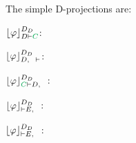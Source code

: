 \begin{example}
\label{example:DProjectionDefinitional}


The simple D-projections are:


\begin{multicols}{3}{
$\projectionDDefinitional{\varphi}{D \seq \hE{C}}$:
\begin{prooftree}
 
 
 
\end{prooftree}

$\projectionDDefinitional{\varphi}{D, \hF{C} \seq }$:
\begin{prooftree}
 
 
 
 
\end{prooftree}

$\projectionDDefinitional{\varphi}{\hE{C} \seq D, \hF{C}}$:
\begin{prooftree}
		 
		 
	 
\end{prooftree}
}
\end{multicols}


\begin{multicols}{3}{
$\projectionDDefinitional{\varphi}{\seq E, \hD{A}}$:
\begin{prooftree}
 
 
 
 
\end{prooftree}

$\projectionDDefinitional{\varphi}{\seq E, \hC{B}}$:
\begin{prooftree}
 
 
 
 
\end{prooftree}

}
\end{multicols}
\end{example}
